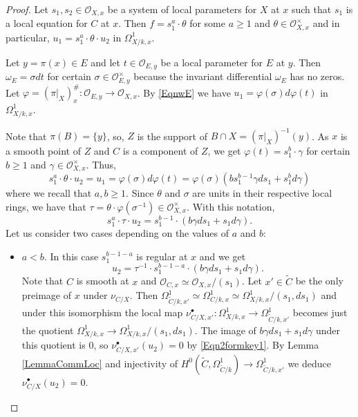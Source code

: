 \documentclass[11pt]{amsart}
\theoremstyle{remark}
\numberwithin{equation}{section}
\newcommand{\Ocal}{\mathscr{O}}
\begin{document}
\begin{proof}
 Let $s_1,s_2\in \Ocal_{X,x}$ be a system of local parameters for $X$ at $x$ such that $s_1$ is a local equation for $C$ at $x$. Then $f=s_1^a\cdot \theta$ for some $a\ge 1$ and $\theta\in \Ocal_{X,x}^\times$ and in particular, $u_1=s_1^a\cdot \theta\cdot u_2$ in $\Omega^1_{X/k,x}$. 

Let $y=\pi(x)\in E$ and let $t\in \Ocal_{E,y}$ be a local parameter for $E$ at $y$. Then $\omega_E=\sigma dt$ for certain $\sigma\in \Ocal_{E,y}^\times$ because the invariant differential $\omega_E$ has no zeros. Let $\varphi=(\pi|_X)^\#_x : \Ocal_{E,y}\to \Ocal_{X,x}$. By \eqref{EqnwE} we have $u_1=\varphi(\sigma)d\varphi(t)$ in $\Omega^1_{X/k, x}$.

Note that $\pi(B)=\{y\}$, so,  $Z$ is the support of $B\cap X=(\pi|_X)^{-1}(y)$. As $x$ is a smooth point of $Z$ and $C$ is a component of $Z$, we get $\varphi(t)=s_1^b\cdot \gamma$ for certain $b\ge 1$ and $\gamma\in \Ocal_{X,x}^\times$. Thus, 
$$
s_1^a\cdot \theta\cdot u_2 = u_1 = \varphi(\sigma)d\varphi(t)= \varphi(\sigma)\left( bs_1^{b-1}\gamma d s_1+ s_1^{b}d\gamma \right)
$$
where we recall that $a,b\ge 1$. Since $\theta$ and $\sigma$ are units in their respective local rings, we have that $\tau=\theta\cdot \varphi(\sigma^{-1})\in \Ocal_{X,x}^\times$. With this notation,
\begin{equation}\label{Eqn2formkey}
s_1^a \cdot \tau\cdot u_2 = s_1^{b-1}\cdot \left( b\gamma ds_1 + s_1 d\gamma \right).
\end{equation} 
Let us consider two cases depending on the values of $a$ and $b$:
\begin{itemize}
\item $a<b$. In this case $s_1^{b-1-a}$ is regular at $x$ and we get
\begin{equation}\label{Eqn2formkey1}
 u_2 = \tau^{-1}\cdot s_1^{b-1-a}\cdot \left( b\gamma ds_1 + s_1 d\gamma \right).
\end{equation}
Note that $C$ is smooth at $x$ and $\Ocal_{C,x}\simeq \Ocal_{X,x}/(s_1)$. Let $x'\in \widetilde{C}$ be the only preimage of $x$ under $\nu_{C/X}$.  Then $\Omega^1_{\widetilde{C}/k,x'}\simeq \Omega^1_{C/k,x}  \simeq \Omega^1_{X/k,x}/(s_1, ds_1)$ and under this isomorphism the local map $\nu_{C/X,x'}^\bullet:\Omega^1_{X/k,x}\to \Omega^1_{\widetilde{C}/k,x'}$ becomes just the quotient $\Omega^1_{X/k,x}\to \Omega^1_{X/k,x}/(s_1, ds_1)$. The image of $b\gamma ds_1 + s_1 d\gamma$ under this quotient is $0$, so $\nu_{C/X,x'}^\bullet(u_2)=0$ by \eqref{Eqn2formkey1}. By Lemma \ref{LemmaCommLoc} and injectivity of $H^0(\widetilde{C},\Omega^1_{\widetilde{C}/k})\to  \Omega^1_{\widetilde{C}/k,x'}$ we deduce $\nu^\bullet_{C/X}(u_2)=0$.



\end{itemize}
\end{proof}
\end{document}
